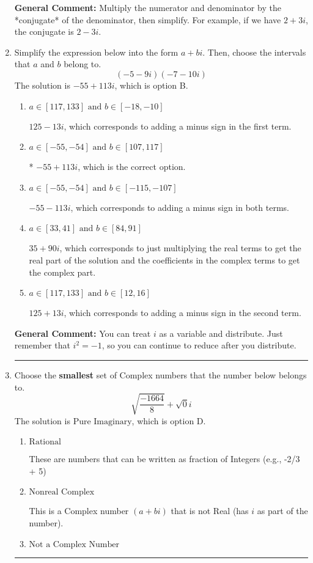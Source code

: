 \documentclass{extbook}[14pt]
\newcommand{\litem}[1]{\item #1

\rule{\textwidth}{0.4pt}}
\begin{document}
\begin{enumerate}
{\textbf{General Comment:} Multiply the numerator and denominator by the *conjugate* of the denominator, then simplify. For example, if we have $2+3i$, the conjugate is $2-3i$.
}
\litem{
Simplify the expression below into the form $a+bi$. Then, choose the intervals that $a$ and $b$ belong to.
\[ (-5 - 9 i)(-7 - 10 i) \]The solution is \( -55 + 113 i \), which is option B.\begin{enumerate}[label=\Alph*.]
\item \( a \in [117, 133] \text{ and } b \in [-18, -10] \)

 $125 - 13 i$, which corresponds to adding a minus sign in the first term.
\item \( a \in [-55, -54] \text{ and } b \in [107, 117] \)

* $-55 + 113 i$, which is the correct option.
\item \( a \in [-55, -54] \text{ and } b \in [-115, -107] \)

 $-55 - 113 i$, which corresponds to adding a minus sign in both terms.
\item \( a \in [33, 41] \text{ and } b \in [84, 91] \)

 $35 + 90 i$, which corresponds to just multiplying the real terms to get the real part of the solution and the coefficients in the complex terms to get the complex part.
\item \( a \in [117, 133] \text{ and } b \in [12, 16] \)

 $125 + 13 i$, which corresponds to adding a minus sign in the second term.
\end{enumerate}

\textbf{General Comment:} You can treat $i$ as a variable and distribute. Just remember that $i^2=-1$, so you can continue to reduce after you distribute.
}
\litem{
Choose the \textbf{smallest} set of Complex numbers that the number below belongs to.
\[ \sqrt{\frac{-1664}{8}}+\sqrt{0}i \]The solution is \( \text{Pure Imaginary} \), which is option D.\begin{enumerate}[label=\Alph*.]
\item \( \text{Rational} \)

These are numbers that can be written as fraction of Integers (e.g., -2/3 + 5)
\item \( \text{Nonreal Complex} \)

This is a Complex number $(a+bi)$ that is not Real (has $i$ as part of the number).
\item \( \text{Not a Complex Number} \)


\end{enumerate}}
\end{enumerate}
\end{document}
